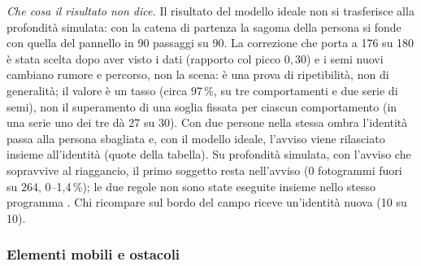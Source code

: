 \emph{Che cosa il risultato non dice.} Il risultato del modello ideale non si trasferisce alla profondità simulata: con la catena di partenza la sagoma della persona si fonde con quella del pannello in 90 passaggi su 90. La correzione che porta a 176 su 180 è stata scelta dopo aver visto i dati (rapporto col picco $0{,}30$) e i semi nuovi cambiano rumore e percorso, non la scena: è una prova di ripetibilità, non di generalità; il valore è un tasso (circa 97\,\%, su tre comportamenti e due serie di semi), non il superamento di una soglia fissata per ciascun comportamento (in una serie uno dei tre dà 27 su 30). Con due persone nella stessa ombra l'identità passa alla persona sbagliata e, con il modello ideale, l'avviso viene rilasciato insieme all'identità (quote della tabella). Su profondità simulata, con l'avviso che sopravvive al riaggancio, il primo soggetto resta nell'avviso (0 fotogrammi fuori su 264, 0–1,4\,\%); le due regole non sono state eseguite insieme nello stesso programma . Chi ricompare sul bordo del campo riceve un'identità nuova (10 su 10).

\subsubsection*{Elementi mobili e ostacoli}

